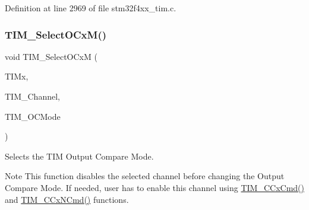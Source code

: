 Definition at line 2969 of file stm32f4xx\+\_\+tim.\+c.

\mbox{\label{group___t_i_m_ga83ea0af5a7c1af521236ce5e4d2c42b0}} 
\subsubsection{\texorpdfstring{T\+I\+M\+\_\+\+Select\+O\+Cx\+M()}{TIM\_SelectOCxM()}}
{\footnotesize\ttfamily void T\+I\+M\+\_\+\+Select\+O\+CxM (\begin{DoxyParamCaption}\item[{\hyperlink{struct_t_i_m___type_def}{T\+I\+M\+\_\+\+Type\+Def} $\ast$}]{T\+I\+Mx,  }\item[{uint16\+\_\+t}]{T\+I\+M\+\_\+\+Channel,  }\item[{uint16\+\_\+t}]{T\+I\+M\+\_\+\+O\+C\+Mode }\end{DoxyParamCaption})}



Selects the T\+IM Output Compare Mode. 

\begin{DoxyNote}{Note}
This function disables the selected channel before changing the Output Compare Mode. If needed, user has to enable this channel using \hyperlink{group___t_i_m___group2_ga3ecc4647d9ede261beb5e0535cf29ebb}{T\+I\+M\+\_\+\+C\+Cx\+Cmd()} and \hyperlink{group___t_i_m___group2_ga304ff7c8a1615498da749bf2507e9f2b}{T\+I\+M\+\_\+\+C\+Cx\+N\+Cmd()} functions. 
\end{DoxyNote}

